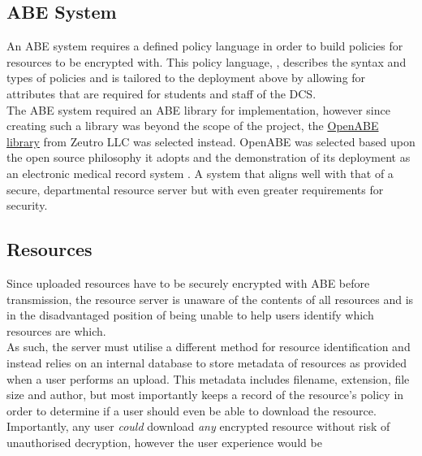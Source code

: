 \subsection{ABE System}
\label{subsec:design_abe_sys}

An ABE system requires a defined policy language in order to build policies for resources to be encrypted with. This policy language, \thePolicyLang, describes the syntax and types of policies and is tailored to the deployment above by allowing for attributes that are required for students and staff of the DCS.\\
The ABE system required an ABE library for implementation, however since creating such a library was beyond the scope of the project, the \href{https://github.com/zeutro/openabe}{OpenABE library} from Zeutro LLC was selected instead. OpenABE was selected based upon the open source philosophy it adopts and the demonstration of its deployment as an electronic medical record system \citet{Akinyele2011}. A system that aligns well with that of a secure, departmental resource server but with even greater requirements for security.

\subsection{Resources}
\label{subsec:design_resources}

Since uploaded resources have to be securely encrypted with ABE before transmission, the resource server is unaware of the contents of all resources and is in the disadvantaged position of being unable to help users identify which resources are which.\\
As such, the server must utilise a different method for resource identification and instead relies on an internal database to store metadata of resources as provided when a user performs an upload. This metadata includes filename, extension, file size and author, but most importantly keeps a record of the resource's policy in order to determine if a user should even be able to download the resource.\\
Importantly, any user \textit{could} download \textit{any} encrypted resource without risk of unauthorised decryption, however the user experience would be
